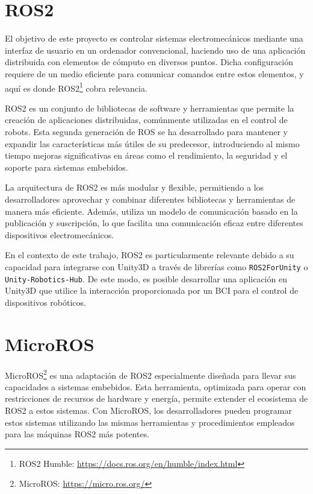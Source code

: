 \section{ROS2}
El objetivo de este proyecto es controlar sistemas electromecánicos mediante una interfaz de usuario en un ordenador convencional, haciendo uso de una aplicación distribuida con elementos de cómputo en diversos puntos. Dicha configuración requiere de un medio eficiente para comunicar comandos entre estos elementos, y aquí es donde ROS2\footnote{ROS2 Humble: \url{https://docs.ros.org/en/humble/index.html}} cobra relevancia.



ROS2 es un conjunto de bibliotecas de software y herramientas que permite la creación de aplicaciones distribuidas, comúnmente utilizadas en el control de robots. Esta segunda generación de ROS se ha desarrollado para mantener y expandir las características más útiles de su predecesor, introduciendo al mismo tiempo mejoras significativas en áreas como el rendimiento, la seguridad y el soporte para sistemas embebidos.



La arquitectura de ROS2 es más modular y flexible, permitiendo a los desarrolladores aprovechar y combinar diferentes bibliotecas y herramientas de manera más eficiente. Además, utiliza un modelo de comunicación basado en la publicación y suscripción, lo que facilita una comunicación eficaz entre diferentes dispositivos electromecánicos.



En el contexto de este trabajo, ROS2 es particularmente relevante debido a su capacidad para integrarse con Unity3D a través de librerías como \texttt{ROS2ForUnity} o \texttt{Unity-Robotics-Hub}. De este modo, es posible desarrollar una aplicación en Unity3D que utilice la interacción proporcionada por un BCI para el control de dispositivos robóticos.


\section{MicroROS}

MicroROS\footnote{MicroROS: \url{https://micro.ros.org/}} es una adaptación de ROS2 especialmente diseñada para llevar sus capacidades a sistemas embebidos. Esta herramienta, optimizada para operar con restricciones de recursos de hardware y energía, permite extender el ecosistema de ROS2 a estos sistemas. Con MicroROS, los desarrolladores pueden programar estos sistemas utilizando las mismas herramientas y procedimientos empleados para las máquinas ROS2 más potentes.




